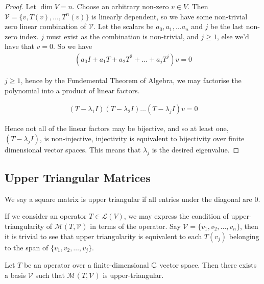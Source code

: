\documentclass[]{article}
\begin{document}
\begin{proof}
		Let $\dim V = n$. Choose an arbitrary non-zero $v \in V$. Then $\mathcal{V} = \{v, T(v), \ldots, T^{n}(v)\}$ is linearly dependent, so we have some non-trivial zero linear combination of $\mathcal{V}$. Let the scalars be $a_0, a_1, \ldots a_n$ and $j$ be the last non-zero index. $j$ must exist as the combination is non-trivial, and $j \geq 1$, else we'd have that $v = 0$. So we have
		\begin{align*}
				(a_0 I + a_1 T + a_2 T^2 + \ldots + a_j T^j) v = 0
		\end{align*}

		$j \geq 1$, hence by the Fundemental Theorem of Algebra, we may factorise the polynomial into a product of linear factors.

		\begin{align*}
				(T - \lambda_1 I) (T - \lambda_2 I) \ldots (T - \lambda_j I) v = 0
		\end{align*}

		Hence not all of the linear factors may be bijective, and so at least one, $(T - \lambda_j I)$, is non-injective, injectivity is equivalent to bijectivity over finite dimensional vector spaces. This means that $\lambda_j$ is the desired eigenvalue.
\end{proof}

\subsection{Upper Triangular Matrices}

\begin{defi} 
		We say a square matrix is upper triangular if all entries under the diagonal are $0$.
\end{defi}

If we consider an operator $T \in \mathcal{L}(V)$, we may express the condition of upper-triangularity of $\mathcal{M}(T, \mathcal{V})$ in terms of the operator. Say $\mathcal{V} = \{v_1, v_2, \ldots, v_n\}$, then it is trivial to see that upper triangularity is equivalent to each $T(v_j)$ belonging to the span of $\{v_1, v_2, \ldots, v_j\}$.

\begin{thm}
		Let $T$ be an operator over a finite-dimensional $\mathbb{C}$ vector space. Then there exists a basis $\mathcal{V}$ such that $\mathcal{M}(T, \mathcal{V})$ is upper-triangular.
\end{thm}
\end{document}
